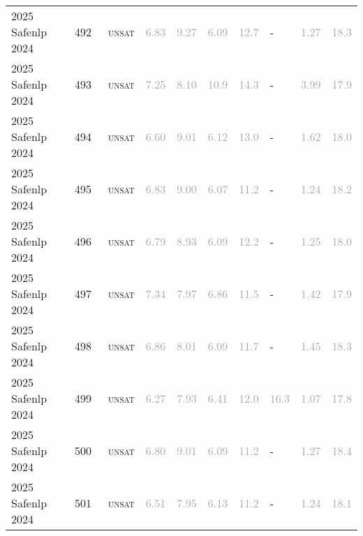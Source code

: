 \begin{center}
{\begin{longtable}{@{}llllllllll@{}}
2025 Safenlp 2024 & 492 & ~\textsc{unsat} & \textcolor{darkgray}{6.83} & \textcolor{darkgray}{9.27} & \textcolor{darkgray}{6.09} & \textcolor{darkgray}{12.7} & - & \textcolor{darkgray}{1.27} & \textcolor{darkgray}{18.3} \\
2025 Safenlp 2024 & 493 & ~\textsc{unsat} & \textcolor{darkgray}{7.25} & \textcolor{darkgray}{8.10} & \textcolor{darkgray}{10.9} & \textcolor{darkgray}{14.3} & - & \textcolor{darkgray}{3.99} & \textcolor{darkgray}{17.9} \\
2025 Safenlp 2024 & 494 & ~\textsc{unsat} & \textcolor{darkgray}{6.60} & \textcolor{darkgray}{9.01} & \textcolor{darkgray}{6.12} & \textcolor{darkgray}{13.0} & - & \textcolor{darkgray}{1.62} & \textcolor{darkgray}{18.0} \\
2025 Safenlp 2024 & 495 & ~\textsc{unsat} & \textcolor{darkgray}{6.83} & \textcolor{darkgray}{9.00} & \textcolor{darkgray}{6.07} & \textcolor{darkgray}{11.2} & - & \textcolor{darkgray}{1.24} & \textcolor{darkgray}{18.2} \\
2025 Safenlp 2024 & 496 & ~\textsc{unsat} & \textcolor{darkgray}{6.79} & \textcolor{darkgray}{8.93} & \textcolor{darkgray}{6.09} & \textcolor{darkgray}{12.2} & - & \textcolor{darkgray}{1.25} & \textcolor{darkgray}{18.0} \\
2025 Safenlp 2024 & 497 & ~\textsc{unsat} & \textcolor{darkgray}{7.34} & \textcolor{darkgray}{7.97} & \textcolor{darkgray}{6.86} & \textcolor{darkgray}{11.5} & - & \textcolor{darkgray}{1.42} & \textcolor{darkgray}{17.9} \\
2025 Safenlp 2024 & 498 & ~\textsc{unsat} & \textcolor{darkgray}{6.86} & \textcolor{darkgray}{8.01} & \textcolor{darkgray}{6.09} & \textcolor{darkgray}{11.7} & - & \textcolor{darkgray}{1.45} & \textcolor{darkgray}{18.3} \\
2025 Safenlp 2024 & 499 & ~\textsc{unsat} & \textcolor{darkgray}{6.27} & \textcolor{darkgray}{7.93} & \textcolor{darkgray}{6.41} & \textcolor{darkgray}{12.0} & \textcolor{darkgray}{16.3} & \textcolor{darkgray}{1.07} & \textcolor{darkgray}{17.8} \\
2025 Safenlp 2024 & 500 & ~\textsc{unsat} & \textcolor{darkgray}{6.80} & \textcolor{darkgray}{9.01} & \textcolor{darkgray}{6.09} & \textcolor{darkgray}{11.2} & - & \textcolor{darkgray}{1.27} & \textcolor{darkgray}{18.4} \\
2025 Safenlp 2024 & 501 & ~\textsc{unsat} & \textcolor{darkgray}{6.51} & \textcolor{darkgray}{7.95} & \textcolor{darkgray}{6.13} & \textcolor{darkgray}{11.2} & - & \textcolor{darkgray}{1.24} & \textcolor{darkgray}{18.1} \\

\end{longtable}}
\end{center}
